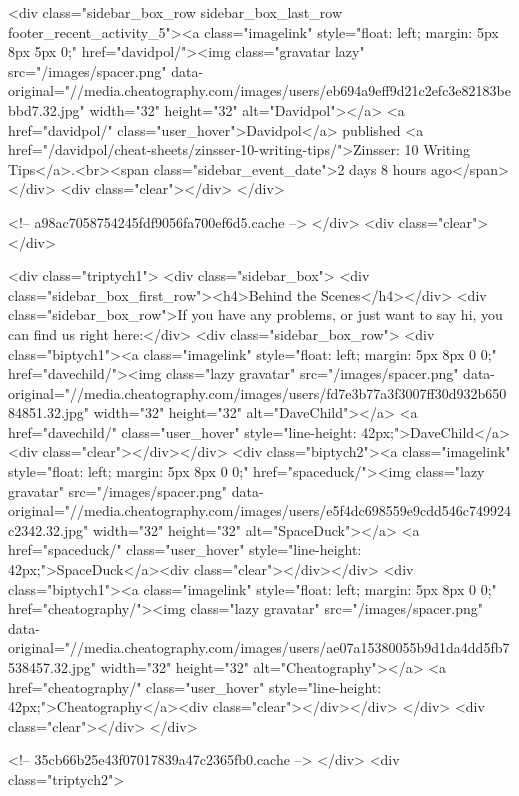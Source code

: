             <div class="sidebar_box_row sidebar_box_last_row footer_recent_activity_5"><a class="imagelink" style="float: left; margin: 5px 8px 5px 0;" href="davidpol/"><img class="gravatar lazy" src="/images/spacer.png" data-original="//media.cheatography.com/images/users/eb694a9eff9d21c2efc3e82183bebbd7.32.jpg" width="32" height="32" alt="Davidpol"></a> <a href="davidpol/" class="user_hover">Davidpol</a> published <a href="/davidpol/cheat-sheets/zinsser-10-writing-tips/">Zinsser: 10 Writing Tips</a>.<br><span class="sidebar_event_date">2 days 8 hours ago</span></div>
        <div class="clear"></div>
</div>


<!-- a98ac7058754245fdf9056fa700ef6d5.cache -->            </div>
            <div class="clear"></div>

            <div class="triptych1">
                <div class="sidebar_box">
    <div class="sidebar_box_first_row"><h4>Behind the Scenes</h4></div>
    <div class="sidebar_box_row">If you have any problems, or just want to say hi, you can find us right here:</div>
    <div class="sidebar_box_row">
                <div class="biptych1"><a class="imagelink" style="float: left; margin: 5px 8px 0 0;" href="davechild/"><img class="lazy gravatar" src="/images/spacer.png" data-original="//media.cheatography.com/images/users/fd7e3b77a3f3007ff30d932b65084851.32.jpg" width="32" height="32" alt="DaveChild"></a> <a href="davechild/" class="user_hover" style="line-height: 42px;">DaveChild</a><div class="clear"></div></div>
            <div class="biptych2"><a class="imagelink" style="float: left; margin: 5px 8px 0 0;" href="spaceduck/"><img class="lazy gravatar" src="/images/spacer.png" data-original="//media.cheatography.com/images/users/e5f4dc698559e9cdd546c749924c2342.32.jpg" width="32" height="32" alt="SpaceDuck"></a> <a href="spaceduck/" class="user_hover" style="line-height: 42px;">SpaceDuck</a><div class="clear"></div></div>
            <div class="biptych1"><a class="imagelink" style="float: left; margin: 5px 8px 0 0;" href="cheatography/"><img class="lazy gravatar" src="/images/spacer.png" data-original="//media.cheatography.com/images/users/ae07a15380055b9d1da4dd5fb7538457.32.jpg" width="32" height="32" alt="Cheatography"></a> <a href="cheatography/" class="user_hover" style="line-height: 42px;">Cheatography</a><div class="clear"></div></div>
        </div>
    <div class="clear"></div>
</div>


<!-- 35cb66b25e43f07017839a47c2365fb0.cache -->            </div>
            <div class="triptych2">
                
